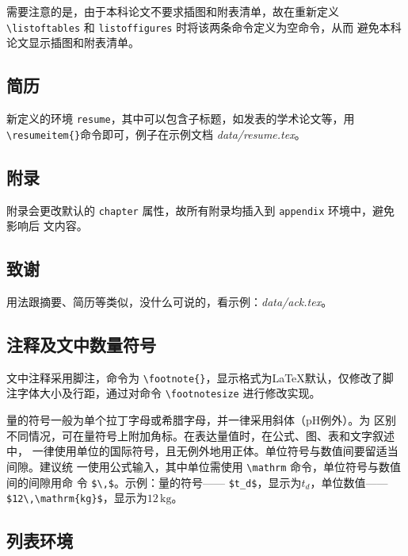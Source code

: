 需要注意的是，由于本科论文不要求插图和附表清单，故在重新定义
\verb|\listoftables| 和 \verb|listoffigures| 时将该两条命令定义为空命令，从而
避免本科论文显示插图和附表清单。

\subsection*{简历}

新定义的环境 \texttt{resume}，其中可以包含子标题，如发表的学术论文等，用
\verb|\resumeitem{}|命令即可，例子在示例文档 \emph{data/resume.tex}。

\subsection*{附录}

附录会更改默认的 \texttt{chapter} 属性，故所有附录均插入到 \texttt{appendix} 环境中，避免影响后
文内容。
\begin{code}
\begin{appendix}
 
 
\end{appendix}
\end{code}

\subsection*{致谢}

用法跟摘要、简历等类似，没什么可说的，看示例：\emph{data/ack.tex}。

\subsection*{注释及文中数量符号}

文中注释采用脚注，命令为 \verb|\footnote{}|，显示格式为\LaTeX{}默认，仅修改了脚
注字体大小及行距，通过对命令 \verb|\footnotesize| 进行修改实现。

量的符号一般为单个拉丁字母或希腊字母，并一律采用斜体（$\mathrm{pH}$例外）。为
区别不同情况，可在量符号上附加角标。在表达量值时，在公式、图、表和文字叙述中，
一律使用单位的国际符号，且无例外地用正体。单位符号与数值间要留适当间隙。建议统
一使用公式输入，其中单位需使用 \verb|\mathrm| 命令，单位符号与数值间的间隙用命
令 \verb|$\,$|。示例：量的符号—— \verb|$t_d$|，显示为$t_d$，单位数值——
\verb|$12\,\mathrm{kg}$|，显示为$12\,\mathrm{kg}$。

\subsection*{列表环境}

